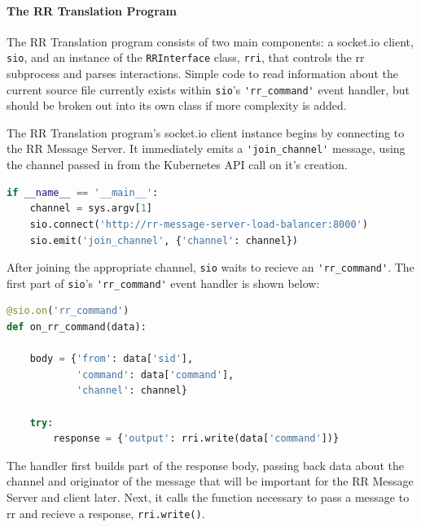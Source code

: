 \documentclass[12pt]{article}
\begin{document}
\paragraph{The RR Translation Program}

The RR Translation program consists of two main components: a socket.io
client, \lstinline{sio}, and an instance of the
\lstinline{RRInterface} class, \lstinline{rri}, that controls the rr
subprocess and parses interactions.  Simple code to read information
about the current source file currently exists within
\lstinline{sio}'s \lstinline{'rr_command'} event handler, but should
be broken out into its own class if more complexity is added.
\par

The RR Translation program's socket.io client instance begins by
connecting to the RR Message Server.  It immediately emits a
\lstinline{'join_channel'} message, using the channel passed in from
the Kubernetes API call on it's creation. \\

\begin{lstlisting}[language=Python,basicstyle=\linespread{0.5}\ttfamily,caption={RR Translation Main},captionpos=b]
if __name__ == '__main__':
    channel = sys.argv[1]
    sio.connect('http://rr-message-server-load-balancer:8000')
    sio.emit('join_channel', {'channel': channel})
\end{lstlisting}

After joining the appropriate channel, \lstinline{sio} waits to
recieve an \lstinline{'rr_command'}.  The first part of
\lstinline{sio}'s \lstinline{'rr_command'} event handler is shown below:\\

\begin{lstlisting}[language=Python,basicstyle=\linespread{0.5}\ttfamily,caption={RR Command Event Handler},captionpos=b]
@sio.on('rr_command')
def on_rr_command(data):

    body = {'from': data['sid'],
            'command': data['command'],
            'channel': channel}
    
    try:
        response = {'output': rri.write(data['command'])}
\end{lstlisting}

The handler first builds part of the response body, passing back data
about the channel and originator of the message that will be important
for the RR Message Server and client later.  Next, it calls the
function necessary to pass a message to rr and recieve a response,
\lstinline{rri.write()}.
\par
\end{document}
